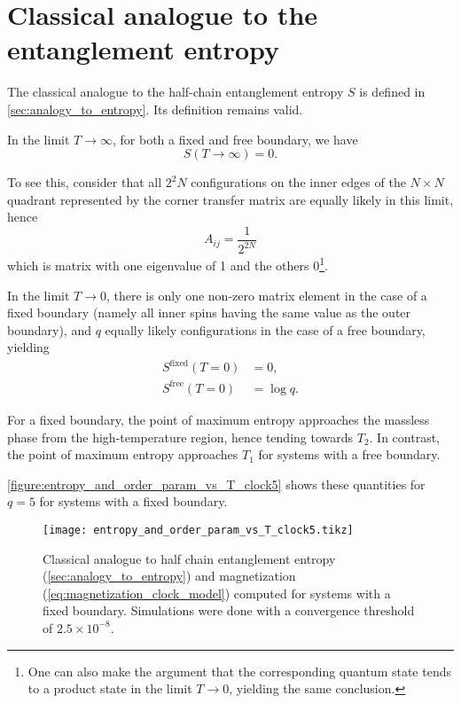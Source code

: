 \section{Classical analogue to the entanglement entropy}

The classical analogue to the half-chain entanglement entropy $S$ is defined in \autoref{sec:analogy_to_entropy}.
Its definition remains valid.

In the limit $T \to \infty$, for both a fixed and free boundary, we have
\begin{equation}
  S(T \to \infty) = 0.
\end{equation}

To see this, consider that all $2^2N$ configurations on the inner edges of the $N \times N$ quadrant represented by the
corner transfer matrix are equally likely in this limit, hence
\begin{equation}
  A_{i j} = \frac{1}{2^{2N}}
\end{equation}
which is matrix with one eigenvalue of 1 and the others 0\footnote{One can also make the argument that the corresponding
quantum state tends to a product state in the limit $T \to 0$,
yielding the same conclusion.}.

In the limit $T \to 0$, there is only one non-zero matrix element in the case of a fixed boundary (namely all inner
spins having the same value as the outer boundary), and $q$ equally likely configurations in the case of a free
boundary, yielding
\begin{align*}
  S^{\text{fixed}}(T = 0) &= 0, \\
  S^{\text{free}}(T = 0)  &= \log q.
\end{align*}

For a fixed boundary, the point of maximum entropy approaches the massless phase from the high-temperature region,
hence tending towards $T_2$.
In contrast, the point of maximum entropy approaches $T_1$ for systems with a free boundary.

\autoref{figure:entropy_and_order_param_vs_T_clock5} shows these quantities for $q = 5$ for systems with a fixed
boundary.

\begin{figure}
  \texttt{[image: entropy\_and\_order\_param\_vs\_T\_clock5.tikz]}
  \caption{Classical analogue to half chain entanglement entropy (\autoref{sec:analogy_to_entropy}) and magnetization
  (\autoref{eq:magnetization_clock_model}) computed for systems with a fixed boundary.
  Simulations were done with a convergence threshold of $2.5 \times
  10^{-8}$.}\label{figure:entropy_and_order_param_vs_T_clock5}
\end{figure}

